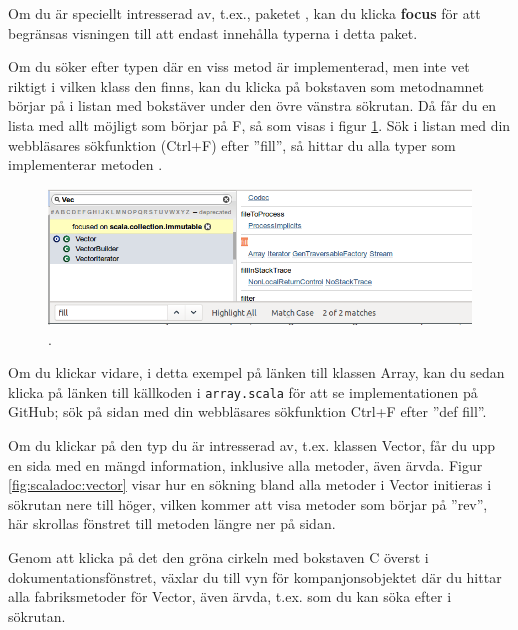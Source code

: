 Om du är speciellt intresserad av, t.ex., paketet , kan du klicka \textbf{focus} för att begränsas visningen till att endast innehålla typerna i detta paket.

Om du söker efter typen där en viss metod är implementerad, men inte vet riktigt i vilken klass den finns, kan du klicka på bokstaven som metodnamnet börjar på i listan med bokstäver under den övre vänstra sökrutan. Då får du en lista med allt möjligt som börjar på F, så som visas i figur \ref{fig:scaladoc:find}. Sök i listan med din webbläsares sökfunktion (Ctrl+F) efter ''fill'', så hittar du alla typer som implementerar metoden . 

\begin{figure}[H]
\centering
\includegraphics[width=1.0\textwidth]{../img/scaladoc/scaladoc-find-fill}

     \caption{ \scaladoc.}
    \label{fig:scaladoc:find}
\end{figure}

Om du klickar vidare, i detta exempel på länken till klassen Array, kan du sedan klicka på länken till källkoden i \texttt{array.scala} för att se implementationen på GitHub; sök på sidan med din webbläsares sökfunktion Ctrl+F efter ''def fill''.





Om du klickar på den typ du är intresserad av, t.ex. klassen Vector, får du upp en sida med en mängd information, inklusive alla metoder, även ärvda. Figur \ref{fig:scaladoc:vector} visar hur en sökning bland alla metoder i Vector initieras i sökrutan nere till höger, vilken kommer att visa metoder som börjar på ''rev'', här skrollas fönstret till metoden  längre ner på sidan.

Genom att klicka på det den gröna cirkeln med bokstaven C överst i dokumentationsfönstret, växlar du till vyn för kompanjonsobjektet där du hittar alla fabriksmetoder för Vector, även ärvda, t.ex.  som du kan söka efter i sökrutan. 



